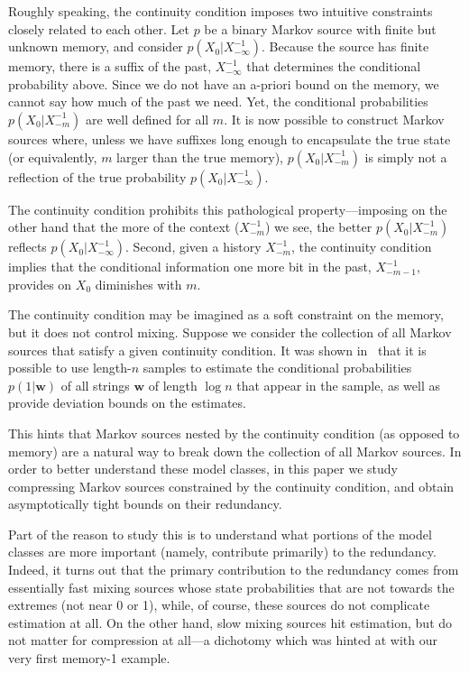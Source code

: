 \documentclass[conference,a4paper]{article}
\newcommand{\w}{\textbf{w}}
\begin{document}
Roughly speaking, the continuity condition imposes two intuitive
constraints closely related to each other.
Let $p$ be a binary Markov source with finite but unknown
memory, and consider $p(X_0|X^{-1}_{-\infty})$. Because the source has
finite memory, there is a suffix of the past, $X_{-\infty}^{-1}$ that
determines the conditional probability above. Since we do not
have an a-priori bound on the memory, we cannot say how much of the
past we need. Yet, the conditional probabilities $p(X_0|X^{-1}_{-m})$
are well defined for all $m$. It is now possible to construct Markov
sources where, unless we have suffixes long enough to encapsulate the
true state (or equivalently, $m$ larger than the true memory),
$p(X_0|X^{-1}_{-m})$ is simply not a reflection of the true probability
$p(X_0|X^{-1}_{-\infty})$. 

The continuity condition prohibits this pathological
property---imposing on the other hand that the more of the context
($X^{-1}_{-m}$) we see, the better $p(X_0|X^{-1}_{-m})$ reflects
$p(X_0|X^{-1}_{-\infty})$.  Second, given a history $X^{-1}_{-m}$, the
continuity condition implies that the conditional information one more
bit in the past, $X_{-m-1}^{-1}$, provides on $X_0$ diminishes with $m$.

The continuity condition may be imagined as a soft constraint on the
memory, but it does not control mixing. Suppose we consider the
collection of all Markov sources that satisfy a given continuity
condition. It was shown in~\cite{asadi2014stationary} that it is possible to use
length-$n$ samples to estimate the conditional probabilities $p(1|\w)$
of all strings $\w$ of length $\log n$ that appear in the sample, as
well as provide deviation bounds on the estimates. 

This hints that Markov sources nested by the continuity condition (as
opposed to memory) are a natural way to break down the collection of
all Markov sources. In order to better understand these model classes,
in this paper we study compressing Markov sources constrained by the
continuity condition, and obtain asymptotically tight bounds on their
redundancy. 

Part of the reason to study this is to understand what portions of the
model classes are more important (namely, contribute primarily) to the
redundancy. Indeed, it turns out that the primary contribution to the
redundancy comes from essentially fast mixing sources whose state
probabilities that are not towards the extremes (not near 0 or 1), 
while, of course, these sources do not complicate estimation at all.
On the other hand, slow mixing sources hit estimation, but do not 
matter for compression at all---a dichotomy which was hinted at with
our very first memory-1 example. 
\end{document}
